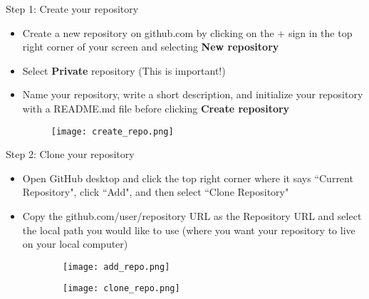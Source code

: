 \documentclass{beamer}
\begin{document}
\begin{frame}{Step 1: Create your repository}
\begin{itemize}
    \item Create a new repository on github.com by clicking on the + sign in the top right corner of your screen and selecting \textbf{New repository}
    \item Select \textbf{Private} repository (This is important!)
    \item Name your repository, write a short description, and initialize your repository with a README.md file before clicking \textbf{Create repository}
\begin{figure}
\texttt{[image: create\_repo.png]}
\end{figure}
\end{itemize}
\end{frame}

\begin{frame}{Step 2: Clone your repository}
\begin{itemize}
    \item Open GitHub desktop and click the top right corner where it says ``Current Repository", click ``Add", and then select ``Clone Repository"
    \item Copy the github.com/user/repository URL as the Repository URL and select the local path you would like to use (where you want your repository to live on your local computer)
\end{itemize}
\begin{figure}
\centering
\begin{subfigure}{\textwidth}
  \centering
  \texttt{[image: add\_repo.png]}
\end{subfigure}%
\hspace{1cm}
\begin{subfigure}{\textwidth}
  \centering
  \texttt{[image: clone\_repo.png]}
\end{subfigure}
\end{figure}
\end{frame}
\end{document}
